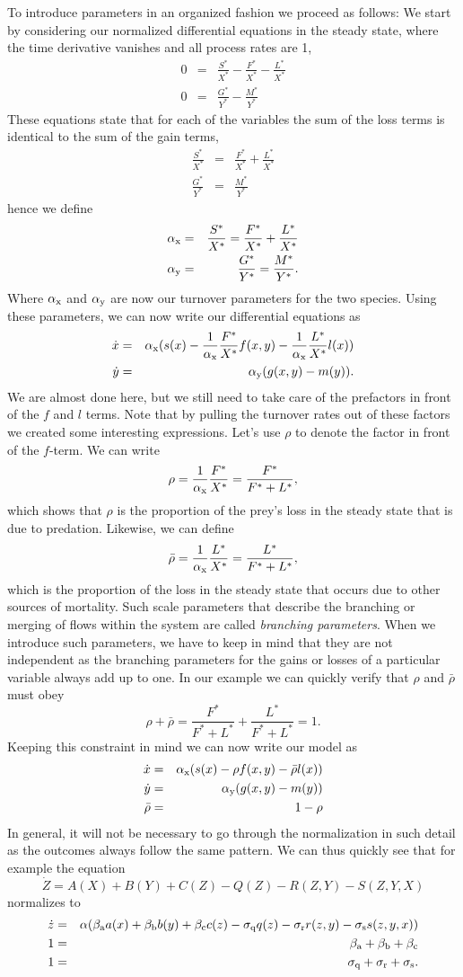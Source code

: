 \documentclass{article}
\newcommand{\eq}[1]{\begin{equation}#1\end{equation}}
\newcommand{\eqa}[1]{\begin{eqnarray}#1\end{eqnarray}}
\begin{document}
To introduce parameters in an organized fashion we proceed as follows: We start by considering our normalized differential equations in the steady state, where the time derivative vanishes and all process rates are 1,
\eqa{
0&=&\frac{S^*}{X^*}-\frac{F^*}{X^*}-\frac{L^*}{X^*}\\
0&=&\frac{G^*}{Y^*}-\frac{M^*}{Y^*}
}
These equations state that for each of the variables the sum of the loss terms is identical to the sum of the gain terms,
\eqa{
\frac{S^*}{X^*}&=&\frac{F^*}{X^*}+\frac{L^*}{X^*}\\
\frac{G^*}{Y^*}&=&\frac{M^*}{Y^*}
}
hence we define 
\eqa{
\alpha_{\rm x}&=&\frac{S^*}{X^*}=\frac{F^*}{X^*}+\frac{L^*}{X^*} \\\label{eqalphay}
\alpha_{\rm y}&=&\frac{G^*}{Y^*}=\frac{M^*}{Y^*}.
}
Where $\alpha_{\rm x}$ and $\alpha_{\rm y}$ are now our turnover parameters for the two species. 
Using these parameters, we can now write our differential equations as 
\eqa{
\dot{x}&=&\alpha_{\rm x}(s(x)-\frac{1}{\alpha_{\rm x}}\frac{F^*}{X^*}f(x,y)-\frac{1}{\alpha_{\rm x}}\frac{L^*}{X^*}l(x))\\
\dot{y}&=&\alpha_{\rm y}(g(x,y)-m(y)).
}
We are almost done here, but we still need to take care of the prefactors in front of the $f$ and $l$ terms. Note that by pulling the turnover rates out of these factors we created some interesting expressions. Let's use $\rho$ to denote the factor in front of the $f$-term. We can write   
\eq{
\rho = \frac{1}{\alpha_{\rm x}}\frac{F^*}{X^*} = \frac{F^*}{F^*+L^*}, 
}
which shows that $\rho$ is the proportion of the prey's loss in the steady state that is due to predation. Likewise, we can define
\eq{
\bar{\rho} 
= \frac{1}{\alpha_{\rm x}}\frac{L^*}{X^*} = \frac{L^*}{F^*+L^*},
}
which is the proportion of the loss in the steady state that occurs due to other sources of mortality. Such scale parameters that describe the branching or merging of flows within the system are called \emph{branching parameters}. When we introduce such parameters, we have to keep in mind that they are not independent as the branching parameters for the gains or losses of a particular variable always add up to one. In our example we can quickly verify that $\rho$ and $\bar{\rho}$ must obey
\eq{
\rho+\bar{\rho}=\frac{F^*}{F^*+L^*}+\frac{L^*}{F^*+L^*} = 1.
}
Keeping this constraint in mind we can now write our model as 
\eqa{
\dot{x}&=&\alpha_{\rm x}(s(x)-\rho f(x,y)-\bar{\rho}l(x))\\
\dot{y}&=&\alpha_{\rm y}(g(x,y)-m(y))\\
\bar{\rho}&=&1-\rho
}
In general, it will not be necessary to go through the normalization in such detail as the outcomes always follow the same pattern. We can thus quickly see that for example the equation 
\eq{
\dot{Z}=A(X)+B(Y)+C(Z)-Q(Z)-R(Z,Y)-S(Z,Y,X)
}
normalizes to 
\eqa{
\dot{z}&=&\alpha(\beta_{\rm a}a(x)+\beta_{\rm b}b(y)+\beta_{\rm c}c(z)-\sigma_{\rm q}q(z)-\sigma_{\rm r}r(z,y)-\sigma_{\rm s}s(z,y,x)) \\ 
1 &=& \beta_{\rm a} + \beta_{\rm b} + \beta_{\rm c} \\
1 &=& \sigma_{\rm q} + \sigma_{\rm r} + \sigma_{\rm s}.
}
\end{document}
